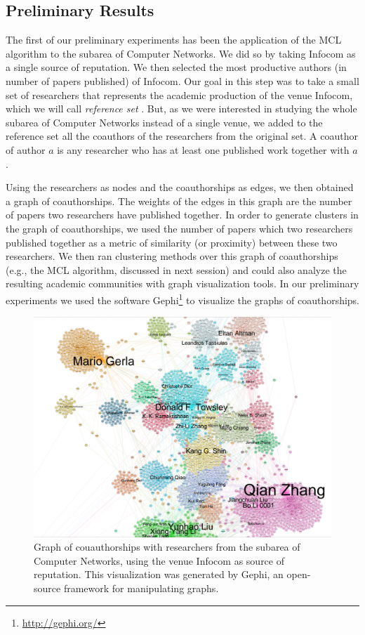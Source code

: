 \documentclass[msc]{ppgccufmg}
\begin{document}
\begin{appendices}
\section{Preliminary Results}

The first of our preliminary experiments has been the application of the MCL algorithm to the subarea of Computer Networks. We did so by taking Infocom as a single source of reputation. We then selected the most productive authors (in number of papers published) of Infocom. Our goal in this step was to take a small set of researchers that represents the academic production of the venue Infocom, which we will call \textit{reference set} . But, as we were interested in studying the whole subarea of Computer Networks instead of a single venue, we added to the reference set all the coauthors of the researchers from the original set. A coauthor of author $a$ is any researcher who has at least one published work together with $a$. 

Using the researchers as nodes and the coauthorships as edges, we then obtained a graph of coauthorships. The weights of the edges in this graph are the number of papers two researchers have published together. In order to generate clusters in the graph of coauthorships, we used the number of papers which two researchers published together as a metric of similarity (or proximity) between these two researchers. We then ran clustering methods over this graph of coauthorships (e.g., the MCL algorithm, discussed in next session) and could also analyze the resulting academic communities with graph visualization tools. In our preliminary experiments we used the software Gephi\footnote{\url{http://gephi.org/}} to visualize the graphs of coauthorships.

\begin{figure}[h]
    \centering
    \includegraphics[scale=0.3]{fig/infocom}
    \caption{Graph of couauthorships with researchers from the subarea of Computer Networks, using the venue Infocom as source of reputation. This visualization was generated by Gephi, an open-source framework for manipulating graphs.}
    \label{fig:exemplo}
\end{figure}


\end{appendices}
\end{document}
